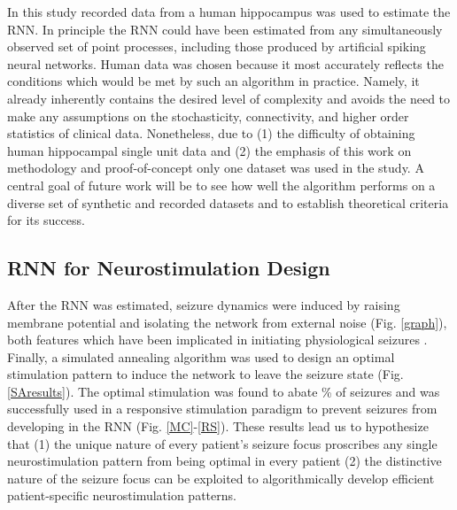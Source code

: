 \documentclass[11pt,a4paper,final]{article}
\begin{document}
In this study recorded data from a human hippocampus was used to estimate the RNN.
In principle the RNN could have been estimated from any simultaneously observed set of point processes, including those produced by artificial spiking neural networks.
Human data was chosen because it most accurately reflects the conditions which would be met by such an algorithm in practice.
Namely, it already inherently contains the desired level of complexity and avoids the need to make any assumptions on the stochasticity, connectivity, and higher order statistics of clinical data.
Nonetheless, due to (1) the difficulty of obtaining human hippocampal single unit data and (2) the emphasis of this work on methodology and proof-of-concept only one dataset was used in the study.
A central goal of future work will be to see how well the algorithm performs on a diverse set of synthetic and recorded datasets and to establish theoretical criteria for its success.

\subsection{RNN for Neurostimulation Design}

After the RNN was estimated, seizure dynamics were induced by raising membrane potential and isolating the network from external noise (Fig. \ref{graph}), both features which have been implicated in initiating physiological seizures \citep{fricker99,wendling03,warren10}.
Finally, a simulated annealing algorithm was used to design an optimal stimulation pattern to induce the network to leave the seizure state (Fig. \ref{SAresults}).
The optimal stimulation was found to abate \success{}\% of seizures and was  successfully used in a responsive stimulation paradigm to prevent seizures from developing in the RNN (Fig. \ref{MC}-\ref{RS}).
These results lead us to hypothesize that (1) the unique nature of every patient's seizure focus proscribes any single neurostimulation pattern from being optimal in every patient (2) the distinctive nature of the seizure focus can be exploited to algorithmically develop efficient patient-specific neurostimulation patterns.
\end{document}
